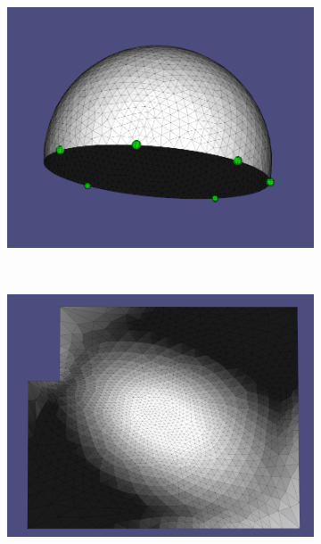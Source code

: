 \begin{figure}
\begin{subfigure}{0.25\textwidth}
\includegraphics[height = \textwidth]{images/halfshpere_polygon}
\caption{}
\end{subfigure}\ \ \ \ \ \ \ \ \ \ \ \ \
\begin{subfigure}{0.25\textwidth}
\includegraphics[height = \textwidth]{images/halfsphere_polygon_emb}

\end{subfigure}
\end{figure}
